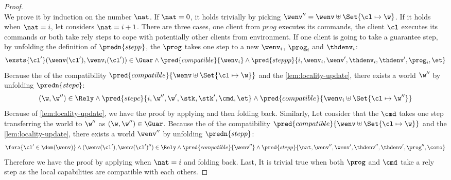 \begin{proof}
\[\]
We prove it by induction on the number \( \nat \).
If \( \nat = 0\), it holds trivially by picking \( \wenv'' = \wenv \uplus \Set{\cl \mapsto \w} \).
If it holds when \( \nat = i\), let considers \( \nat = i + 1\).
There are three cases, one client from \( prog \) executes its commands, the client \( \cl \) executes its commands or both take rely steps to cope with potentially other clients from environment.
If one client is going to take a guarantee step, by unfolding the definition of \( \predn{stepp} \), the \( \prog \) takes one step to a new \( \wenv_i\), \( \prog_i \) and \( \thdenv_i \):
\[
\exsts{\cl'} (\wenv(\cl'), \wenv_i(\cl')) \in \Guar \land  \pred{compatible}{\wenv_i} \land \pred{steppp}{i, \wenv_i, \wenv', \thdenv_i, \thdenv', \prog_i, \et}
\]
Because the of the compatibility \( \pred{compatible}{\wenv \uplus \Set{\cl \mapsto \w}} \) and the \cref{lem:locality-update}, there exists a world \( \w''\) by unfolding \( \predn{stepc} \):
\[
    (\w, \w'') \in \Rely \land \pred{stepc}{i, \w'', \w', \stk, \stk', \cmd, \et}  \land \pred{compatible}{\wenv_i \uplus \Set{\cl \mapsto \w''}}
\]
Because of \cref{lem:locality-update}, we have the proof by applying \ih and then folding back.
Similarly, Let consider that the \( \cmd \) takes one step transferring the world to \( \w'' \) as \( (\w, \w'') \in \Guar \).
Because the of the compatibility \( \pred{compatible}{\wenv \uplus \Set{\cl \mapsto \w}} \) and the \cref{lem:locality-update}, there exists a world \( \wenv''\) by unfolding \( \predn{stepp} \):
\[
    \fora{\cl' \in \dom(\wenv)} \land (\wenv(\cl'), \wenv(\cl')'') \in \Rely \land \pred{compatible}{\wenv''} \land \pred{stepp}{ \nat, \wenv'', \wenv', \thdenv'', \thdenv',\prog'', \como} 
\]
Therefore we have the proof by applying \ih when \( \nat = i \) and folding back.
Last, It is trivial true when both \( \prog\) and \( \cmd \) take a rely step as the local capabilities are compatible with each others.

\end{proof}


